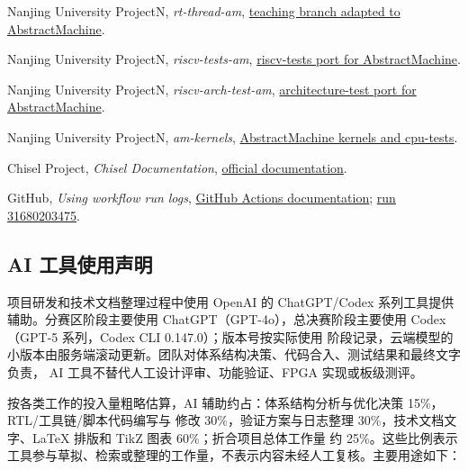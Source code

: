 \begin{enumerate}[label={\textup{[\arabic*]}},leftmargin=3em,itemsep=0.08em,topsep=0.2em]
  \item Nanjing University ProjectN, \emph{rt-thread-am},
  \href{https://github.com/NJU-ProjectN/rt-thread-am}{teaching branch adapted to AbstractMachine}.
  \item Nanjing University ProjectN, \emph{riscv-tests-am},
  \href{https://github.com/NJU-ProjectN/riscv-tests-am}{riscv-tests port for AbstractMachine}.
  \item Nanjing University ProjectN, \emph{riscv-arch-test-am},
  \href{https://github.com/NJU-ProjectN/riscv-arch-test-am}{architecture-test port for AbstractMachine}.
  \item Nanjing University ProjectN, \emph{am-kernels},
  \href{https://github.com/NJU-ProjectN/am-kernels}{AbstractMachine kernels and cpu-tests}.
  \item Chisel Project, \emph{Chisel Documentation},
  \href{https://www.chisel-lang.org/docs}{official documentation}.
  \item GitHub, \emph{Using workflow run logs},
  \href{https://docs.github.com/en/actions/how-tos/monitor-workflows/use-workflow-run-logs}{GitHub Actions documentation};
  \href{https://github.com/HanPiM/jyd/actions/runs/31680203475}{run 31680203475}.
\end{enumerate}
\normalsize

\clearpage
\subsection{AI 工具使用声明}

项目研发和技术文档整理过程中使用 OpenAI 的 ChatGPT/Codex 系列工具提供辅助。分赛区阶段主要使用
ChatGPT（GPT-4o），总决赛阶段主要使用 Codex（GPT-5 系列，Codex CLI 0.147.0）；版本号按实际使用
阶段记录，云端模型的小版本由服务端滚动更新。团队对体系结构决策、代码合入、测试结果和最终文字负责，
AI 工具不替代人工设计评审、功能验证、FPGA 实现或板级测评。

按各类工作的投入量粗略估算，AI 辅助约占：体系结构分析与优化决策 15\%，RTL/工具链/脚本代码编写与
修改 30\%，验证方案与日志整理 30\%，技术文档文字、LaTeX 排版和 TikZ 图表 60\%；折合项目总体工作量
约 25\%。这些比例表示工具参与草拟、检索或整理的工作量，不表示内容未经人工复核。主要用途如下：

